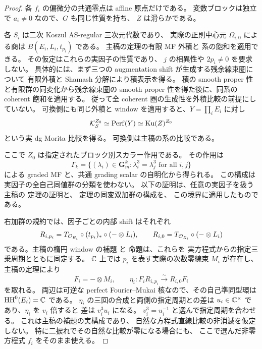 \begin{proof}
各 $f_i$ の偏微分の共通零点は affine 原点だけである。
変数ブロックは独立で $a_i\ne0$ なので、$G$ も同じ性質を持ち、
$Z$ は滑らかである。

各 $S_i$ は二次 Koszul AS-regular 三次元代数であり、
実際の正則中心元 $\Omega_{i,0}$ による商は
$B(E_i,L_i,t_{p_i})$ である。
主稿の定理の有限 MF 外積と
系の飽和を適用できる。
その仮定はこれらの実因子の性質であり、
$j$ の相異性や $2p_i\ne0$ を要求しない。
具体的には、まず三つの augmentation shift が生成する残余線束圏について
有限外積と Shamash 分解により積表示を得る。
積の smooth proper 性と有限群の同変化から残余線束圏の
smooth proper 性を得た後に、同系の coherent 飽和を適用する。
従って全 coherent 圏の生成性を外積比較の前提にしていない。
可換側にも同じ外積と window を適用すると、$Y=\prod_iE_i$ に対し
\begin{equation}\label{ebk:eq:equivariant-products}
 \mathcal K_S^{Z_0}\simeq\operatorname{Perf}(Y)
       \simeq\operatorname{Ku}(Z)^{Z_0}
\end{equation}
という実 dg Morita 比較を得る。
可換側は主稿の系の比較である。

ここで $Z_0$ は指定されたブロック別スカラー作用である。
その作用は
\[
 \Gamma_k=\{(\lambda_i)\in\mathbf G_m^k:
                    \lambda_i^3=\lambda_j^3\text{ for all }i,j\}
\]
による graded MF と、共通 grading scalar の自明化から得られる。
この構成は実因子の全自己同値群の分類を使わない。
以下の証明は、任意の実因子を扱う主稿の
定理の証明と、
定理の同変双加群の構成を、
この境界に適用したものである。

右加群の規約では、因子ごとの内部 shift はそれぞれ
\[
 R_{i,p_i}=T_{\mathcal O_{E_i}}\circ(t_{p_i})_*\circ(-\otimes L_i),
 \qquad
 R_{i,0}=T_{\mathcal O_{E_i}}\circ(-\otimes L_i)
\]
である。主稿の楕円 window の補題
と
命題は、これらを
実方程式からの指定三乗周期とともに同定する。
$\mathbb C$ 上では $p_i$ を表す実際の次数零線束 $M_i$ が存在し、
主稿の定理により
\[
 F_i=-\otimes M_i,\qquad
 \eta_i:F_iR_{i,p_i}\xrightarrow{\sim}R_{i,0}F_i
\]
を取れる。
両辺は可逆な perfect Fourier--Mukai 核なので、その自己準同型環は
$\mathrm{HH}^0(E_i)=\mathbb C$ である。
$\eta_i$ の三回の合成と両側の指定周期との差は
$u_i\in\mathbb C^\times$ であり、$\eta_i$ を $v_i$ 倍すると
差は $v_i^3u_i$ になる。
$v_i^3=u_i^{-1}$ と選んで指定周期を合わせる。
これは主稿の補題の実構成であり、
自然な方程式直線比較の非消滅を仮定しない。
特に二捩れでその自然な比較が零になる場合にも、
ここで選んだ非零方程式 $f_i$ をそのまま使える。


\end{proof}
